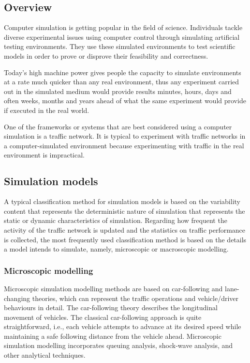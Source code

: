 \subsection{Overview}
	Computer simulation is getting popular in the field of science. Individuals tackle diverse experimental issues using computer control through simulating artificial testing environments. They use these simulated environments to test scientific models in order to prove or disprove their feasibility and correctness.
	 
	Today's high machine power gives people the capacity to simulate environments at a rate much quicker than any real environment, thus any experiment carried out in the simulated medium would provide results minutes, hours, days and often weeks, months and years ahead of what the same experiment would provide if executed in the real world.
	
	One of the frameworks or systems that are best considered using a computer simulation is a traffic network. It is typical to experiment with traffic networks in a computer-simulated environment because experimenting with traffic in the real environment is impractical. 

\subsection{Simulation models}
	A typical classification method for simulation models is based on the variability content that represents the deterministic nature of simulation that represents the static or dynamic characteristics of simulation. Regarding how frequent the activity of the traffic network is updated and the statistics on traffic performance is collected, the most frequently used classification method is based on the details a model intends to simulate, namely, microscopic or macroscopic modelling.
\subsubsection{Microscopic modelling}
	Microscopic simulation modelling methods are based on car-following and lane-changing theories, which can represent the traffic operations and vehicle/driver behaviours in detail. The car-following theory describes the longitudinal movement of vehicles. The classical car-following approach is quite straightforward, i.e., each vehicle attempts to advance at its desired speed while maintaining a safe following distance from the vehicle ahead\cite{rathi1986freesim}. Microscopic simulation modelling incorporates queuing analysis, shock-wave analysis, and other analytical techniques.
